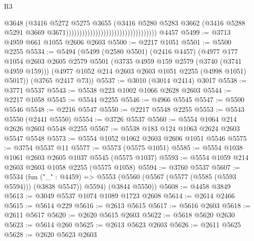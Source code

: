 \begin{lexlean}{R3}
\begin{coremodule}
                                                                  @3648
                                                                  (@3416
                                                                    @5272
                                                                    @5275
                                                                    @3655
                                                                    (@3416
                                                                      @5280
                                                                      @5283
                                                                      @3662
                                                                      (@3416
                                                                        @5288
                                                                        @5291
                                                                        @3669
                                                                        @3671))))))))))))))))))))))))))))))))))
    @4457
@5499 := @3713 @4959 @661 @1055 @2606 @2603
@5500 := @2217 @1051
@5501 := @5500 @2255
@5534 := @5494
    (@5499
      (@2580 @5501)
      (@2416 @4457)
      (@4977
        @177
        @1054
        @2603
        @2605
        @2579
        @5501
        (@3735 @4959 @159 @2579 (@3740 (@3741 @4959 @159)))
        (@4977 @1052 @214 @2603 @2603 @1051 @2255 (@4998 @1051) @5017))
      (@3765 @2417 @73))
@5537 := @3010 (@3014 @2414) @3017
@5538 := @3771 @5537
@5543 := @5538 @223 @1002 @1066 @2628 @2603
@5544 := @2217 @1058
@5545 := @5544 @2255
@5546 := @4966 @5545
@5547 := @5500 @5546
@5548 := @2216 @5547
@5550 := @2217 @5548 @2255
@5553 := @5543 @5550 (@2441 @5550)
@5554 := @3726 @5537
@5560 := @5554 @1064 @214 @2626 @2603 @5548 @2255
@5567 := @5538 @183 @124 @1063 @2624 @2603 @5547 @5548
@5573 := @5554 @1052 @1062 @2603 @2606 @1051 @5546
@5575 := @3754 @5537 @11
@5577 := @5573 (@5575 @1051)
@5585 := @5554 @1038 @1061 @2603 @2605 @1037 @5545 (@5575 @1037)
@5593 := @5554 @1059 @214 @2603 @2603 @1058 @2255 (@5575 @1058)
@5594 := @3760 @5537
@5607 := @5534
    (fun ("_" : @4459) =>
    @5553 (@5560 (@5567 (@5577 (@5585 (@5593 @5594))) (@3838 @5547)) @5594) (@3844 @5550))
@5608 := @4458 @3849
@5613 := @3049 @5537 @1074 @1089 @1723 @2608
@5614 := @2614 @2466
@5615 := @5614 @229
@5616 := @2613 @5615
@5617 := @5616 @2603
@5618 := @2611 @5617
@5620 := @2620 @5615 @2603
@5622 := @5618 @5620 @2630
@5623 := @5614 @260
@5625 := @2613 @5623 @2603
@5626 := @2611 @5625
@5628 := @2620 @5623 @2603

\end{coremodule}
\end{lexlean}
